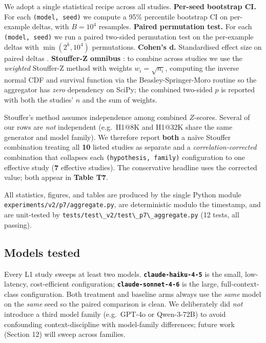 We adopt a single statistical recipe across all studies. \textbf{Per-seed bootstrap CI.} For each \passthrough{\lstinline!(model, seed)!} we compute a 95\% percentile bootstrap CI \citep{efron1979bootstrap} on per-example deltas, with \(B=10^4\) resamples. \textbf{Paired permutation test.} For each \passthrough{\lstinline!(model, seed)!} we run a paired two-sided permutation test \citep{good2005permutation} on the per-example deltas with \(\min(2^k, 10^4)\) permutations. \textbf{Cohen's d.} Standardised effect size on paired deltas \citep{cohen1988statistical}. \textbf{Stouffer-Z omnibus} \citep{stouffer1949combining, liptak1958combining}: to combine across studies we use the \emph{weighted} Stouffer-Z method with weights \(w_i = \sqrt{n_i}\), computing the inverse normal CDF and survival function via the Beasley-Springer-Moro routine \citep{beasley1977normal, moro1995tail} so the aggregator has \emph{zero} dependency on SciPy; the combined two-sided \(p\) is reported with both the studies' \(n\) and the sum of weights.

Stouffer's method assumes independence among combined \(Z\)-scores. Several of our rows are \emph{not} independent (e.g.~H1@8K and H1@32K share the same generator and model family). We therefore report \textbf{both} a naïve Stouffer combination treating all \textbf{10} listed studies as separate and a \emph{correlation-corrected} combination that collapses each \passthrough{\lstinline!(hypothesis, family)!} configuration to one effective study (\textbf{7} effective studies). The conservative headline uses the corrected value; both appear in \textbf{Table T7}.

All statistics, figures, and tables are produced by the single Python module \passthrough{\lstinline!experiments/v2/p7/aggregate.py!}, are deterministic modulo the timestamp, and are unit-tested by \passthrough{\lstinline!tests/test\_v2/test\_p7\_aggregate.py!} (12 tests, all passing).

\subsection{Models tested}\label{models-tested}

Every L1 study sweeps at least two models. \textbf{\passthrough{\lstinline!claude-haiku-4-5!}} is the small, low-latency, cost-efficient configuration; \textbf{\passthrough{\lstinline!claude-sonnet-4-6!}} is the large, full-context-class configuration. Both treatment and baseline arms always use the \emph{same} model on the \emph{same} seed so the paired comparison is clean. We deliberately did \emph{not} introduce a third model family (e.g.~GPT-4o or Qwen-3-72B) to avoid confounding context-discipline with model-family differences; future work (Section 12) will sweep across families.

